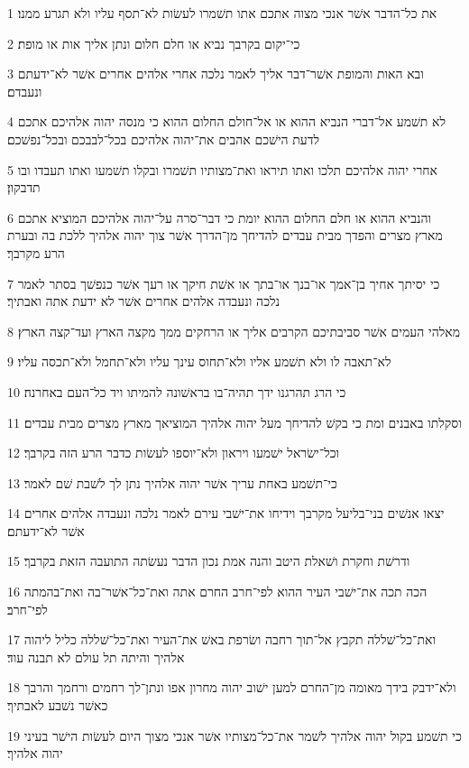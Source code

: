 \par 1 את כל־הדבר אשׁר אנכי מצוה אתכם אתו תשׁמרו לעשׂות לא־תסף עליו ולא תגרע ממנו׃
\par 2 כי־יקום בקרבך נביא או חלם חלום ונתן אליך אות או מופת׃
\par 3 ובא האות והמופת אשׁר־דבר אליך לאמר נלכה אחרי אלהים אחרים אשׁר לא־ידעתם ונעבדם׃
\par 4 לא תשׁמע אל־דברי הנביא ההוא או אל־חולם החלום ההוא כי מנסה יהוה אלהיכם אתכם לדעת הישׁכם אהבים את־יהוה אלהיכם בכל־לבבכם ובכל־נפשׁכם׃
\par 5 אחרי יהוה אלהיכם תלכו ואתו תיראו ואת־מצותיו תשׁמרו ובקלו תשׁמעו ואתו תעבדו ובו תדבקון׃
\par 6 והנביא ההוא או חלם החלום ההוא יומת כי דבר־סרה על־יהוה אלהיכם המוציא אתכם מארץ מצרים והפדך מבית עבדים להדיחך מן־הדרך אשׁר צוך יהוה אלהיך ללכת בה ובערת הרע מקרבך׃
\par 7 כי יסיתך אחיך בן־אמך או־בנך או־בתך או אשׁת חיקך או רעך אשׁר כנפשׁך בסתר לאמר נלכה ונעבדה אלהים אחרים אשׁר לא ידעת אתה ואבתיך׃
\par 8 מאלהי העמים אשׁר סביבתיכם הקרבים אליך או הרחקים ממך מקצה הארץ ועד־קצה הארץ׃
\par 9 לא־תאבה לו ולא תשׁמע אליו ולא־תחוס עינך עליו ולא־תחמל ולא־תכסה עליו׃
\par 10 כי הרג תהרגנו ידך תהיה־בו בראשׁונה להמיתו ויד כל־העם באחרנה׃
\par 11 וסקלתו באבנים ומת כי בקשׁ להדיחך מעל יהוה אלהיך המוציאך מארץ מצרים מבית עבדים׃
\par 12 וכל־ישׂראל ישׁמעו ויראון ולא־יוספו לעשׂות כדבר הרע הזה בקרבך׃
\par 13 כי־תשׁמע באחת עריך אשׁר יהוה אלהיך נתן לך לשׁבת שׁם לאמר׃
\par 14 יצאו אנשׁים בני־בליעל מקרבך וידיחו את־ישׁבי עירם לאמר נלכה ונעבדה אלהים אחרים אשׁר לא־ידעתם׃
\par 15 ודרשׁת וחקרת ושׁאלת היטב והנה אמת נכון הדבר נעשׂתה התועבה הזאת בקרבך׃
\par 16 הכה תכה את־ישׁבי העיר ההוא לפי־חרב החרם אתה ואת־כל־אשׁר־בה ואת־בהמתה לפי־חרב׃
\par 17 ואת־כל־שׁללה תקבץ אל־תוך רחבה ושׂרפת באשׁ את־העיר ואת־כל־שׁללה כליל ליהוה אלהיך והיתה תל עולם לא תבנה עוד׃
\par 18 ולא־ידבק בידך מאומה מן־החרם למען ישׁוב יהוה מחרון אפו ונתן־לך רחמים ורחמך והרבך כאשׁר נשׁבע לאבתיך׃
\par 19 כי תשׁמע בקול יהוה אלהיך לשׁמר את־כל־מצותיו אשׁר אנכי מצוך היום לעשׂות הישׁר בעיני יהוה אלהיך׃

